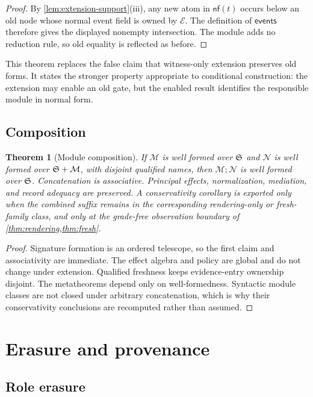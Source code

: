 \documentclass[11pt]{article}
\numberwithin{equation}{section}
\theoremstyle{definition}
\theoremstyle{plain}
\newtheorem{theorem}[definition]{Theorem}
\theoremstyle{remark}
\newcommand{\events}{\mathsf{events}}
\newcommand{\nf}{\mathsf{nf}}
\begin{document}
\begin{proof}
By \cref{lem:extension-support}(iii), any new atom in \(\nf(t)\) occurs below
an old node whose normal event field is owned by \(\mathcal E\).  The
definition of \(\events\) therefore gives the displayed nonempty intersection.
The module adds no reduction rule, so old equality is reflected as before.
\end{proof}

This theorem replaces the false claim that witness-only extension preserves
old forms.  It states the stronger property appropriate to conditional
construction: the extension may enable an old gate, but the enabled result
identifies the responsible module in normal form.

\subsection{Composition}

\begin{theorem}[Module composition]\label{thm:composition}
If \(\mathcal M\) is well formed over \({\mathfrak S}\) and \(\mathcal N\) is well
formed over \({\mathfrak S}+\mathcal M\), with disjoint qualified names, then
\(\mathcal M;\mathcal N\) is well formed over \({\mathfrak S}\).  Concatenation is
associative.  Principal effects, normalization, mediation, and record
adequacy are preserved.  A conservativity corollary is exported only when the
combined suffix remains in the corresponding rendering-only or fresh-family
class, and only at the grade-free observation boundary of
\cref{thm:rendering,thm:fresh}.
\end{theorem}

\begin{proof}
Signature formation is an ordered telescope, so the first claim and
associativity are immediate.  The effect algebra and policy are global and do
not change under extension.  Qualified freshness keeps evidence-entry
ownership disjoint.  The metatheorems depend only on well-formedness.  Syntactic module
classes are not closed under arbitrary concatenation, which is why their
conservativity conclusions are recomputed rather than assumed.
\end{proof}

\section{Erasure and provenance}\label{sec:erasure}

\subsection{Role erasure}
\end{document}
